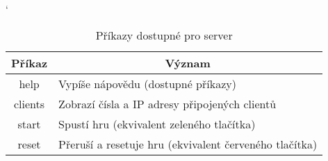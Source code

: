 \begin{table}[hbtp]
\centering
\catcode`
\caption{\label{tab:server_prikazy} Příkazy dostupné pro server}
\begin{tabular}{|c|l|}
\hline
Příkaz  & \multicolumn{1}{c|}{Význam}                            \\ \hline
help    & Vypíše nápovědu (dostupné příkazy)                     \\ \hline
clients & Zobrazí čísla a IP adresy připojených clientů          \\ \hline
start   & Spustí hru (ekvivalent zeleného tlačítka)              \\ \hline
reset   & Přeruší a resetuje hru (ekvivalent červeného tlačítka) \\ \hline
\end{tabular}
\end{table}